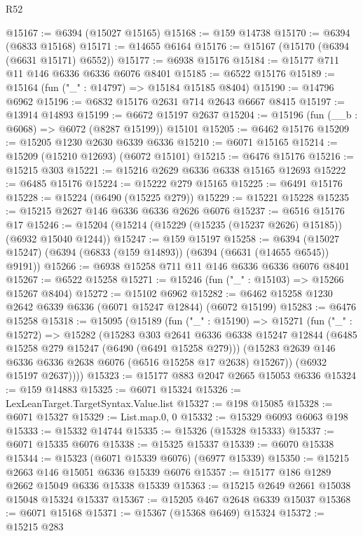 \begin{lexlean}{R52}
\begin{coremodule}
@15167 := @6394 (@15027 @15165)
@15168 := @159 @14738
@15170 := @6394 (@6833 @15168)
@15171 := @14655 @6164
@15176 := @15167 (@15170 (@6394 (@6631 @15171) @6552))
@15177 := @6938 @15176
@15184 := @15177 @711 @11 @146 @6336 @6336 @6076 @8401
@15185 := @6522 @15176
@15189 := @15164 (fun ("_" : @14797) => @15184 @15185 @8404)
@15190 := @14796 @6962
@15196 := @6832 @15176 @2631 @714 @2643 @6667 @8415
@15197 := @13914 @14893
@15199 := @6672 @15197 @2637
@15204 := @15196 (fun (__b : @6068) => @6072 (@8287 @15199)) @15101
@15205 := @6462 @15176
@15209 := @15205 @1230 @2630 @6339 @6336
@15210 := @6071 @15165
@15214 := @15209 (@15210 @12693) (@6072 @15101)
@15215 := @6476 @15176
@15216 := @15215 @303
@15221 := @15216 @2629 @6336 @6338 @15165 @12693
@15222 := @6485 @15176
@15224 := @15222 @279 @15165
@15225 := @6491 @15176
@15228 := @15224 (@6490 (@15225 @279))
@15229 := @15221 @15228
@15235 := @15215 @2627 @146 @6336 @6336 @2626 @6076
@15237 := @6516 @15176 @17
@15246 := @15204 (@15214 (@15229 (@15235 (@15237 @2626) @15185)) (@6932 @15040 @1244))
@15247 := @159 @15197
@15258 := @6394 (@15027 @15247) (@6394 (@6833 (@159 @14893)) (@6394 (@6631 (@14655 @6545)) @9191))
@15266 := @6938 @15258 @711 @11 @146 @6336 @6336 @6076 @8401
@15267 := @6522 @15258
@15271 := @15246 (fun ("_" : @15103) => @15266 @15267 @8404)
@15272 := @15102 @6962
@15282 := @6462 @15258 @1230 @2642 @6339 @6336 (@6071 @15247 @12844) (@6072 @15199)
@15283 := @6476 @15258
@15318 := @15095
    (@15189
      (fun ("_" : @15190) =>
      @15271
        (fun ("_" : @15272) =>
        @15282
          (@15283
            @303
            @2641
            @6336
            @6338
            @15247
            @12844
            (@6485 @15258 @279 @15247 (@6490 (@6491 @15258 @279)))
            (@15283 @2639 @146 @6336 @6336 @2638 @6076 (@6516 @15258 @17 @2638) @15267))
          (@6932 @15197 @2637))))
@15323 := @15177 @883 @2047 @2665 @15053 @6336
@15324 := @159 @14883
@15325 := @6071 @15324
@15326 := LexLeanTarget.TargetSyntax.Value.list
@15327 := @198 @15085
@15328 := @6071 @15327
@15329 := List.map.{0, 0}
@15332 := @15329 @6093 @6063 @198
@15333 := @15332 @14744
@15335 := @15326 (@15328 @15333)
@15337 := @6071 @15335 @6076
@15338 := @15325 @15337
@15339 := @6070 @15338
@15344 := @15323 (@6071 @15339 @6076) (@6977 @15339)
@15350 := @15215 @2663 @146 @15051 @6336 @15339 @6076
@15357 := @15177 @186 @1289 @2662 @15049 @6336 @15338 @15339
@15363 := @15215 @2649 @2661 @15038 @15048 @15324 @15337
@15367 := @15205 @467 @2648 @6339 @15037
@15368 := @6071 @15168
@15371 := @15367 (@15368 @6469) @15324
@15372 := @15215 @283

\end{coremodule}
\end{lexlean}
